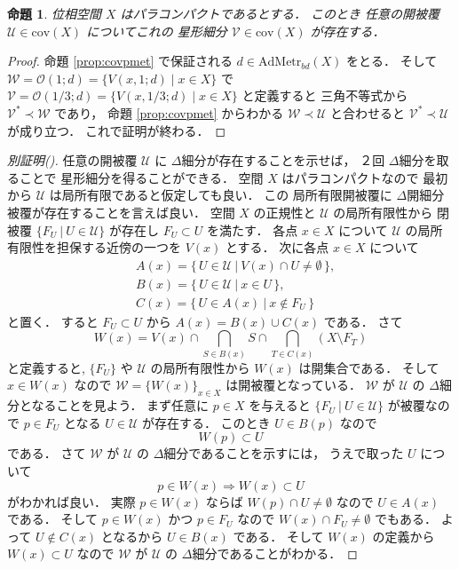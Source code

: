 \documentclass[leqno, a4paper, 12pt]{jsarticle}
\numberwithin{equation}{section}
\newtheorem{prop}[thm]{命題}
\newcommand{\To}{\Longrightarrow}
\newcommand{\yocov}[1]{\mathrm{cov}(#1)}
\newcommand{\yocovfont}[1]{\mathscr{#1}}
\newcommand{\yofine}{\prec}
\newcommand{\yostfine}[1]{#1^{*}}
\newcommand{\yocbamet}[1]{\mathrm{AdMetr}_{bd}(#1)}
\newcommand{\yoball}[3]{V(#1, #2; #3)}
\newcommand{\yoballfam}[2]{\yocovfont{O}(#1; #2)}
\begin{document}
\begin{prop}\label{prop:deltafine}
位相空間
$X$
はパラコンパクトであるとする．
このとき
任意の開被覆
$\yocovfont{U}\in \yocov{X}$
についてこれの
星形細分
$\yocovfont{V}\in \yocov{X}$
が存在する．
\end{prop}
\begin{proof}
命題
\ref{prop:covpmet}
で保証される
$d\in \yocbamet{X}$
をとる．
そして
$\yocovfont{W}=\yoballfam{1}{d}=\{\yoball{x}{1}{d}\mid x\in X\}$
で
$\yocovfont{V}=\yoballfam{1/3}{d}=\{\yoball{x}{1/3}{d}\mid x\in X\}$
と定義すると
三角不等式から
$\yostfine{\yocovfont{V}}\yofine \yocovfont{W}$
であり，
命題
\ref{prop:covpmet}
からわかる
$\yocovfont{W}\yofine \yocovfont{U}$
と合わせると
$\yostfine{\yocovfont{V}}\yofine \yocovfont{U}$
が成り立つ．
これで証明が終わる．
\end{proof}
\begin{proof}[別証明(\cite{MR0026802})]
任意の開被覆
$\yocovfont{U}$
に
$\Delta$細分が存在することを示せば，
２回
$\Delta$細分を取ることで
星形細分を得ることができる．
空間
$X$
はパラコンパクトなので
最初から
$\yocovfont{U}$
は局所有限であると仮定しても良い．
この
局所有限開被覆に
$\Delta$開細分被覆が存在することを言えば良い．
空間
$X$
の正規性と
$\yocovfont{U}$
の局所有限性から
閉被覆
$\{F_{U}\ |\ U\in \yocovfont{U}\}$
が存在し
$F_{U}\subset U$
を満たす．
各点
$x\in X$
について
$\yocovfont{U}$
の局所有限性を担保する近傍の一つを
$V(x)$
とする．
次に各点
$x\in X$
について
\begin{align*}
&A(x)=\{\, U\in \yocovfont{U}\ |\ V(x)\cap U\neq \emptyset\, \},\\
&B(x)=\{\, U\in \yocovfont{U}\ |\ x\in U\, \},\\
&C(x)=\{\, U\in A(x)\ |\ x\not\in F_{U}\, \}
\end{align*}
と置く．
すると
$F_{U}\subset U$
から
$A(x)=B(x)\cup C(x)$
である．
さて
\[
W(x)=V(x)\cap \bigcap_{S\in B(x)}S\cap \bigcap_{T\in C(x)}\left(X\setminus F_{T}\right)
\]
と定義すると, 
$\{F_{U}\}$
や
$\yocovfont{U}$
の局所有限性から
$W(x)$
は開集合である．
そして
$x\in W(x)$
なので
$\yocovfont{W}=\{W(x)\}_{x\in X}$
は開被覆となっている．
$\yocovfont{W}$
が
$\yocovfont{U}$
の
$\Delta$細分となることを見よう．
まず任意に
$p\in X$
を与えると
$\{F_{U}\ |\ U\in \yocovfont{U}\}$
が被覆なので
$p\in F_{U}$
となる
$U\in \yocovfont{U}$
が存在する．
このとき
$U\in B(p)$
なので
\[
W(p)\subset U
\]
である．
さて
$\yocovfont{W}$
が
$\yocovfont{U}$
の
$\Delta$細分であることを示すには，
うえで取った
$U$
について
\[
p\in W(x)\To W(x)\subset U
\]
がわかれば良い．
実際
$p\in W(x)$
ならば
$W(p)\cap U\neq \emptyset$
なので
$U\in A(x)$
である．
そして
$p\in W(x)$
かつ
$p\in F_{U}$
なので
$W(x)\cap F_{U}\neq\emptyset$
でもある．
よって
$U\not\in C(x)$
となるから
$U\in B(x)$
である．
そして
$W(x)$
の定義から
$W(x)\subset U$
なので
$\yocovfont{W}$
が
$\yocovfont{U}$
の
$\Delta$細分であることがわかる．
\end{proof}
\end{document}
